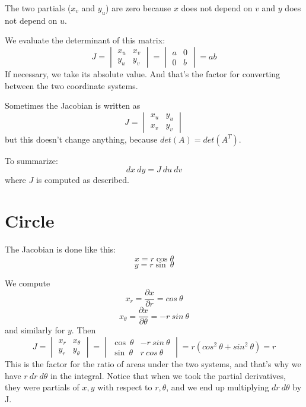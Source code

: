 \documentclass[11pt, oneside]{article}
\begin{document}
The two partials ($x_v$ and $y_u$) are zero because $x$ does not depend on $v$ and  $y$ does not depend on $u$.

We evaluate the determinant of this matrix:
\[ J = 
\begin{vmatrix}
x_u & x_v \\
y_u & y_v 
\end{vmatrix} =
\begin{vmatrix}
a & 0 \\
0 & b
\end{vmatrix} =ab
\]
If necessary, we take its absolute value.  And that's the factor for converting between the two coordinate systems.

Sometimes the Jacobian is written as
\[ J = 
\begin{vmatrix}
x_u & y_u \\
x_v & y_v 
\end{vmatrix}
\]
but this doesn't change anything, because $det(A) = det(A^T)$.

To summarize:
\[ dx \ dy = J \ du \ dv \]
where
$J$ is computed as described.

\section*{Circle}
The Jacobian is done like this: 
\[ x = r \cos \theta \]
\[ y = r \sin\ \theta \]

We compute
\[ x_r = \frac{\partial x}{\partial r} = cos \ \theta \]
\[ x_{\theta} = \frac{\partial x}{\partial \theta} = -r \ sin \ \theta \]
and similarly for $y$.  Then
\[ J = 
\begin{vmatrix}
x_r & x_{\theta} \\
y_r & y_{\theta} 
\end{vmatrix} =
\begin{vmatrix}
\cos\ \theta & -r \ sin\ \theta \\
\sin\ \theta & r \ cos\ \theta 
\end{vmatrix} = r (cos^2\ \theta + sin^2\ \theta) = r
\]
This is the factor for the ratio of areas under the two systems, and that's why we have $r\ dr \ d\theta$ in the integral.  Notice that when we took the partial derivatives, they were partials of $x,y$ with respect to $r,\theta$, and we end up multiplying $dr \ d\theta$ by J.
\end{document}
